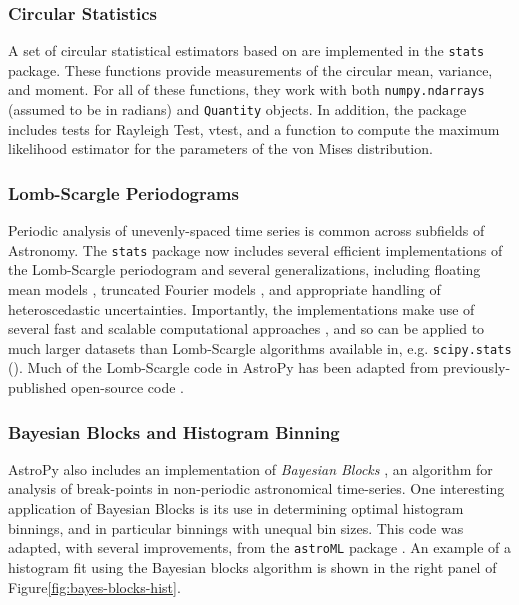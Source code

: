 \documentclass[modern]{aastex61}
\newcommand{\package}[1]{\texttt{#1}\xspace}
\renewcommand{\figurename}{Figure\xspace}
\begin{document}
{\subsubsection{Circular Statistics}

A set of circular statistical estimators based on \citet{JammalamadakaSengupta}
are implemented in the \package{stats} package.  These functions provide
measurements of the circular mean, variance, and moment.   For all of these
functions, they work with both \texttt{numpy.ndarrays} (assumed to be in
radians) and \texttt{Quantity} objects.  In addition, the package includes
tests for Rayleigh Test, vtest, and a function to compute the maximum likelihood estimator for the parameters of the von Mises
distribution.

\subsubsection{Lomb-Scargle Periodograms}
Periodic analysis of unevenly-spaced time series is common across subfields of Astronomy. The \package{stats} package now includes several efficient implementations of the Lomb-Scargle periodogram \citep{Lomb76, Scargle82} and several generalizations, including floating mean models \citep{Zechmeister09}, truncated Fourier models \citep{Bretthorst2003}, and appropriate handling of heteroscedastic uncertainties. Importantly, the implementations make use of several fast and scalable computational approaches \citep[e.g.][]{Press89, Palmer09}, and so can be applied to much larger datasets than Lomb-Scargle algorithms available in, e.g. \package{scipy.stats} (\citealt{scipy}). Much of the Lomb-Scargle code in AstroPy has been adapted from previously-published open-source code \citep{astroML, VanderPlas2015}.

\subsubsection{Bayesian Blocks and Histogram Binning}
AstroPy also includes an implementation of {\it Bayesian Blocks} \citep{Scargle2013}, an algorithm for analysis of break-points in non-periodic astronomical time-series. One interesting application of Bayesian Blocks is its use in determining optimal histogram binnings, and in particular binnings with unequal bin sizes. This code was adapted, with several improvements, from the \package{astroML} package \citep{astroML}. An example of a histogram fit using the Bayesian blocks algorithm is shown in the right panel of \figurename\ref{fig:bayes-blocks-hist}.

}
\end{document}
